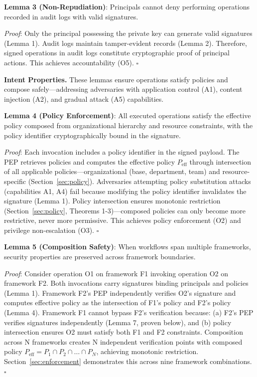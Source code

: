\textbf{Lemma 3 (Non-Repudiation)}: Principals cannot deny performing operations recorded in audit logs with valid signatures.

\textit{Proof}: Only the principal possessing the private key can generate valid signatures (Lemma 1). Audit logs maintain tamper-evident records (Lemma 2). Therefore, signed operations in audit logs constitute cryptographic proof of principal actions. This achieves accountability (O5). $\square$

\noindent\textbf{Intent Properties.} These lemmas ensure operations satisfy policies and compose safely—addressing adversaries with application control (A1), content injection (A2), and gradual attack (A5) capabilities.

\textbf{Lemma 4 (Policy Enforcement)}: All executed operations satisfy the effective policy composed from organizational hierarchy and resource constraints, with the policy identifier cryptographically bound in the signature.

\textit{Proof}: Each invocation includes a policy identifier in the signed payload. The PEP retrieves policies and computes the effective policy $P_{\text{eff}}$ through intersection of all applicable policies—organizational (base, department, team) and resource-specific (Section~\ref{sec:policy}). Adversaries attempting policy substitution attacks (capabilities A1, A4) fail because modifying the policy identifier invalidates the signature (Lemma 1). Policy intersection ensures monotonic restriction (Section~\ref{sec:policy}, Theorems 1-3)—composed policies can only become more restrictive, never more permissive. This achieves policy enforcement (O2) and privilege non-escalation (O3). $\square$

\textbf{Lemma 5 (Composition Safety)}: When workflows span multiple frameworks, security properties are preserved across framework boundaries.

\textit{Proof}: Consider operation O1 on framework F1 invoking operation O2 on framework F2. Both invocations carry signatures binding principals and policies (Lemma 1). Framework F2's PEP independently verifies O2's signature and computes effective policy as the intersection of F1's policy and F2's policy (Lemma 4). Framework F1 cannot bypass F2's verification because: (a) F2's PEP verifies signatures independently (Lemma 7, proven below), and (b) policy intersection ensures O2 must satisfy both F1 and F2 constraints. Composition across N frameworks creates N independent verification points with composed policy $P_{\text{eff}} = P_1 \cap P_2 \cap \ldots \cap P_N$, achieving monotonic restriction. Section~\ref{sec:enforcement} demonstrates this across nine framework combinations. $\square$

